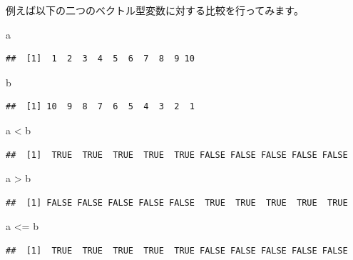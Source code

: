 \documentclass[
  12pt,
]{book}
\newenvironment{Shaded}{\begin{snugshade}}{\end{snugshade}}
\newcommand{\NormalTok}[1]{#1}
\newcommand{\SpecialCharTok}[1]{\textcolor[rgb]{0.00,0.00,0.00}{#1}}
\begin{document}
例えば以下の二つのベクトル型変数に対する比較を行ってみます。

\begin{Shaded}
\begin{Highlighting}[numbers=left,,]
\NormalTok{a}
\end{Highlighting}
\end{Shaded}

\begin{verbatim}
##  [1]  1  2  3  4  5  6  7  8  9 10
\end{verbatim}

\begin{Shaded}
\begin{Highlighting}[numbers=left,,]
\NormalTok{b}
\end{Highlighting}
\end{Shaded}

\begin{verbatim}
##  [1] 10  9  8  7  6  5  4  3  2  1
\end{verbatim}

\begin{Shaded}
\begin{Highlighting}[numbers=left,,]
\NormalTok{a }\SpecialCharTok{\textless{}}\NormalTok{ b}
\end{Highlighting}
\end{Shaded}

\begin{verbatim}
##  [1]  TRUE  TRUE  TRUE  TRUE  TRUE FALSE FALSE FALSE FALSE FALSE
\end{verbatim}

\begin{Shaded}
\begin{Highlighting}[numbers=left,,]
\NormalTok{a }\SpecialCharTok{\textgreater{}}\NormalTok{ b}
\end{Highlighting}
\end{Shaded}

\begin{verbatim}
##  [1] FALSE FALSE FALSE FALSE FALSE  TRUE  TRUE  TRUE  TRUE  TRUE
\end{verbatim}

\begin{Shaded}
\begin{Highlighting}[numbers=left,,]
\NormalTok{a }\SpecialCharTok{\textless{}=}\NormalTok{ b}
\end{Highlighting}
\end{Shaded}

\begin{verbatim}
##  [1]  TRUE  TRUE  TRUE  TRUE  TRUE FALSE FALSE FALSE FALSE FALSE
\end{verbatim}
\end{document}
